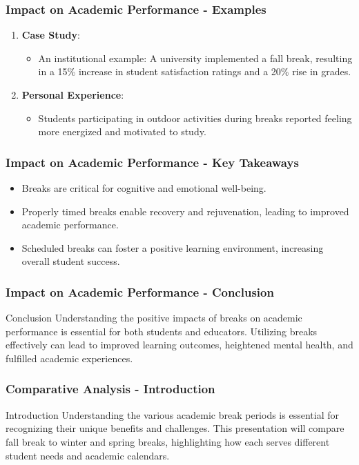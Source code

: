 \documentclass[aspectratio=169]{beamer}
\begin{document}
\begin{frame}[fragile]
    \frametitle{Impact on Academic Performance - Examples}
    \begin{enumerate}
        \item \textbf{Case Study}:
            \begin{itemize}
                \item An institutional example: A university implemented a fall break, resulting in a 15\% increase in student satisfaction ratings and a 20\% rise in grades.
            \end{itemize}
        
        \item \textbf{Personal Experience}:
            \begin{itemize}
                \item Students participating in outdoor activities during breaks reported feeling more energized and motivated to study.
            \end{itemize}
    \end{enumerate}
\end{frame}

\begin{frame}[fragile]
    \frametitle{Impact on Academic Performance - Key Takeaways}
    \begin{itemize}
        \item Breaks are critical for cognitive and emotional well-being.
        \item Properly timed breaks enable recovery and rejuvenation, leading to improved academic performance.
        \item Scheduled breaks can foster a positive learning environment, increasing overall student success.
    \end{itemize}
\end{frame}

\begin{frame}[fragile]
    \frametitle{Impact on Academic Performance - Conclusion}
    \begin{block}{Conclusion}
        Understanding the positive impacts of breaks on academic performance is essential for both students and educators. 
        Utilizing breaks effectively can lead to improved learning outcomes, heightened mental health, and fulfilled academic experiences.
    \end{block}
\end{frame}

\begin{frame}[fragile]
    \frametitle{Comparative Analysis - Introduction}
    \begin{block}{Introduction}
        Understanding the various academic break periods is essential for recognizing their unique benefits and challenges. 
        This presentation will compare fall break to winter and spring breaks, highlighting how each serves different student needs and academic calendars.
    \end{block}
\end{frame}
\end{document}
